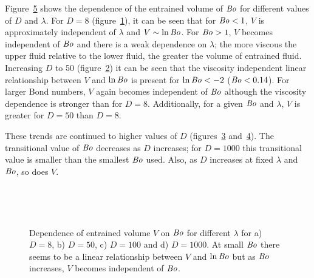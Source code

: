 \documentclass[12pt]{article}
\newcommand\Bo{\mbox{\textit{Bo}}}  %
\begin{document}
Figure~\ref{fig:mdr_snap} shows the dependence of the entrained volume of $\Bo$ for different values of $D$ and $\lambda$. For $D = 8$ (figure~\ref{fig:mdr=8}), it can be seen that for $\Bo < 1$, $V$ is approximately independent of $\lambda$ and $V \sim \ln\Bo$. For $\Bo > 1$, $V$ becomes independent of $\Bo$ and there is a weak dependence on $\lambda$; the more viscous the upper fluid relative to the lower fluid, the greater the volume of entrained fluid. Increasing $D$ to 50 (figure~\ref{fig:mdr=50}) it can be seen that the viscosity independent linear relationship between $V$ and $\ln\Bo$ is present for $\ln \Bo < -2$ ($\Bo < 0.14$). For larger Bond numbers, $V$ again becomes independent of $\Bo$ although the viscosity dependence is stronger than for $D = 8$. Additionally, for a given $\Bo$ and $\lambda$, $V$ is greater for $D = 50$ than $D = 8$.

These trends are continued to higher values of $D$ (figures~\ref{fig:mdr=100} and~\ref{fig:mdr=1000}). The transitional value of $\Bo$ decreases as $D$ increases; for $D = 1000$ this transitional value is smaller than the smallest $\Bo$ used. Also, as $D$ increases at fixed $\lambda$ and $\Bo$, so does $V$.


    \begin{figure}
      \centering
      \begin{subfigure}[b]{0.45\textwidth}
        \resizebox{\textwidth}{!}{\Large }
        \caption{}
        \label{fig:mdr=8}
      \end{subfigure}
      ~
      \begin{subfigure}[b]{0.45\textwidth}
        \resizebox{\textwidth}{!}{\Large }
        \caption{}
        \label{fig:mdr=50}
      \end{subfigure}
      
      \begin{subfigure}[b]{0.45\textwidth}
        \resizebox{\textwidth}{!}{\Large }
        \caption{}
        \label{fig:mdr=100}
      \end{subfigure}
      ~
      \begin{subfigure}[b]{0.45\textwidth}
        \resizebox{\textwidth}{!}{\Large }
        \caption{}
        \label{fig:mdr=1000}
      \end{subfigure}
      \caption{Dependence of entrained volume $V$ on $\Bo$ for different $\lambda$ for a) $D = 8$, b) $D = 50$, c) $D = 100$ and d) $D = 1000$. At small $\Bo$ there seems to be a linear relationship between $V$ and $\ln\Bo$ but as $\Bo$ increases, $V$ becomes independent of $\Bo$. }\label{fig:mdr_snap}
    \end{figure}
\end{document}
